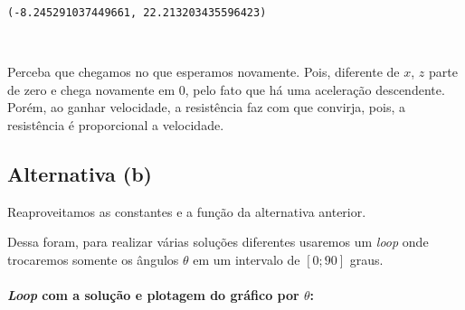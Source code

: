 \documentclass[12pt, a4paper]{article}
\makeatletter
\newcommand{\boxspacing}{\kern\kvtcb@left@rule\kern\kvtcb@boxsep}
\newcommand{\prompt}[4]{
        {\ttfamily\llap{{\color{#2}[#3]:\hspace{3pt}#4}}\vspace{-\baselineskip}}
    }
\makeatother
\begin{document}
            \begin{tcolorbox}[breakable, size=fbox, boxrule=.5pt, pad at break*=1mm, opacityfill=0]
\prompt{Out}{outcolor}{7}{\boxspacing}
\begin{Verbatim}[commandchars=\\\{\}]
(-8.245291037449661, 22.213203435596423)
\end{Verbatim}
\end{tcolorbox}
        
    \begin{center}
    \end{center}
    { \hspace*{\fill} \\}
    
    Perceba que chegamos no que esperamos novamente. Pois, diferente de
\(x\), \(z\) parte de zero e chega novamente em \(0\), pelo fato que há
uma aceleração descendente. Porém, ao ganhar velocidade, a resistência
faz com que convirja, pois, a resistência é proporcional a velocidade.

\hypertarget{alternativa-b}{%
\subsection{Alternativa (b)}\label{alternativa-b}}

Reaproveitamos as constantes e a função da alternativa anterior.

Dessa foram, para realizar várias soluções diferentes usaremos um
\emph{loop} onde trocaremos somente os ângulos \(\theta\) em um
intervalo de \([0; 90]\) graus.

\hypertarget{loop-com-a-soluuxe7uxe3o-e-plotagem-do-gruxe1fico-por-theta}{%
\paragraph{\texorpdfstring{\emph{Loop} com a solução e plotagem do
gráfico por
\(\theta\):}{Loop com a solução e plotagem do gráfico por \textbackslash{}theta:}}\label{loop-com-a-soluuxe7uxe3o-e-plotagem-do-gruxe1fico-por-theta}}
\end{document}
